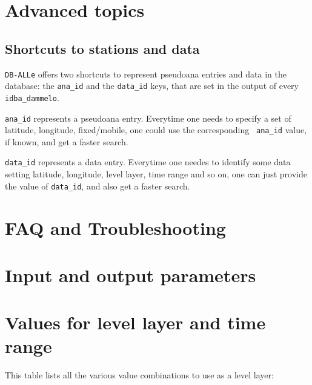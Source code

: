 \documentclass[final,12pt,a4paper,twoside]{book}
\newcommand{\dballe}{{\tt DB-ALLe}}
\begin{document}
\chapter{Advanced topics}

\section{Shortcuts to stations and data}

\dballe{} offers two shortcuts to represent pseudoana entries and data in the
database: the {\tt ana\_id} and the {\tt data\_id} keys, that are set in the
output of every {\tt idba\_dammelo}.

{\tt ana\_id} represents a pseudoana entry.  Everytime one needs to specify a
set of latitude, longitude, fixed/mobile, one could use the corresponding {\tt
ana\_id} value, if known, and get a faster search.

{\tt data\_id} represents a data entry.  Everytime one needes to identify some
data setting latitude, longitude, level layer, time range and so on, one can
just provide the value of {\tt data\_id}, and also get a faster search.



\chapter{FAQ and Troubleshooting}
\label{ch-trouble}

\appendix

\chapter{Input and output parameters}

\label{parmtable}



\chapter{Values for level layer and time range}

This table lists all the various value combinations to use as a level layer:
\end{document}
